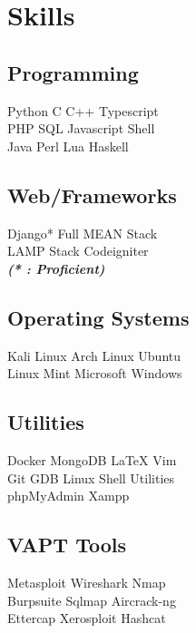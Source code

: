 \documentclass[]{deedy-resume-openfont}
\begin{document}
\begin{minipage}[t]{0.30\textwidth}
\section{Skills}
\subsection{Programming}
Python \textbullet{} C \textbullet{} C++ \textbullet{} Typescript \\
PHP \textbullet{} SQL \textbullet{} Javascript \textbullet{}  Shell \\
 \vspace{0.1 cm}
 Java \textbullet{} Perl \textbullet{} Lua \textbullet{} Haskell \\
\vspace{0.4 cm} 
\subsection{Web/Frameworks}
Django* \textbullet{} Full MEAN Stack \\
LAMP Stack \textbullet{} Codeigniter \\
{\footnotesize \textit{\textbf{ (* : Proficient)}}}
\vspace{0.4 cm}
\subsection{Operating Systems}
Kali Linux \textbullet{} Arch Linux \textbullet{} Ubuntu \\
Linux Mint \textbullet{} Microsoft Windows
\vspace{0.4 cm}
\subsection{Utilities}
Docker \textbullet{} MongoDB \textbullet{} \LaTeX{} \textbullet{} Vim \\
Git \textbullet{} GDB \textbullet{} Linux Shell Utilities \\
phpMyAdmin \textbullet{} Xampp
\vspace{0.4 cm}
\subsection{VAPT Tools}
Metasploit \textbullet{} Wireshark \textbullet{} Nmap \\
Burpsuite \textbullet{} Sqlmap \textbullet{} Aircrack-ng \\
Ettercap \textbullet{} Xerosploit \textbullet{} Hashcat


\end{minipage}
\end{document}
